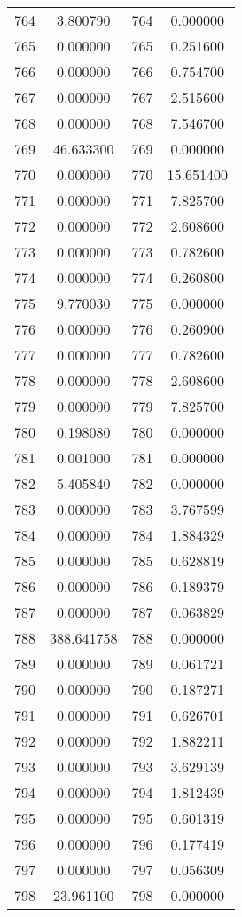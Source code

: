 \documentclass[12pt]{article}
\begin{document}
\begin{longtable}{@{}cccc@{}}
764 & 3.800790 & 764 & 0.000000 \\
765 & 0.000000 & 765 & 0.251600 \\
766 & 0.000000 & 766 & 0.754700 \\
767 & 0.000000 & 767 & 2.515600 \\
768 & 0.000000 & 768 & 7.546700 \\
769 & 46.633300 & 769 & 0.000000 \\
770 & 0.000000 & 770 & 15.651400 \\
771 & 0.000000 & 771 & 7.825700 \\
772 & 0.000000 & 772 & 2.608600 \\
773 & 0.000000 & 773 & 0.782600 \\
774 & 0.000000 & 774 & 0.260800 \\
775 & 9.770030 & 775 & 0.000000 \\
776 & 0.000000 & 776 & 0.260900 \\
777 & 0.000000 & 777 & 0.782600 \\
778 & 0.000000 & 778 & 2.608600 \\
779 & 0.000000 & 779 & 7.825700 \\
780 & 0.198080 & 780 & 0.000000 \\
781 & 0.001000 & 781 & 0.000000 \\
782 & 5.405840 & 782 & 0.000000 \\
783 & 0.000000 & 783 & 3.767599 \\
784 & 0.000000 & 784 & 1.884329 \\
785 & 0.000000 & 785 & 0.628819 \\
786 & 0.000000 & 786 & 0.189379 \\
787 & 0.000000 & 787 & 0.063829 \\
788 & 388.641758 & 788 & 0.000000 \\
789 & 0.000000 & 789 & 0.061721 \\
790 & 0.000000 & 790 & 0.187271 \\
791 & 0.000000 & 791 & 0.626701 \\
792 & 0.000000 & 792 & 1.882211 \\
793 & 0.000000 & 793 & 3.629139 \\
794 & 0.000000 & 794 & 1.812439 \\
795 & 0.000000 & 795 & 0.601319 \\
796 & 0.000000 & 796 & 0.177419 \\
797 & 0.000000 & 797 & 0.056309 \\
798 & 23.961100 & 798 & 0.000000 \\

\end{longtable}
\end{document}

